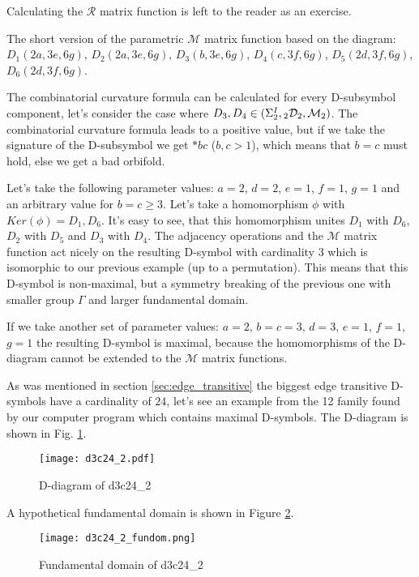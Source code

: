\documentclass[12pt,a4paper]{article}
\numberwithin{equation}{section}
\newcommand{\leftsub}[2]{{\vphantom{#2}}_{#1}{#2}}
\theoremstyle{plain}%
\theoremstyle{definition}
\theoremstyle{remark}
\begin{document}
Calculating the $\mathcal{R}$ matrix function is left to the reader as an
exercise.

The short version of the parametric $\mathcal{M}$ matrix function based on the
diagram: $D_1(2a, 3e, 6g)$, $D_2(2a, 3e, 6g)$, $D_3(b, 3e, 6g)$, $D_4(c, 3f,
6g)$, $D_5(2d, 3f, 6g)$, $D_6(2d, 3f, 6g)$.

The combinatorial curvature formula can be calculated for every D-subsymbol
component,
let's consider the case where
$D_3,D_4\in(\Sigma^I_2,\leftsub{2}{\mathcal{D}}_2,\mathcal{M}_2)$. The combinatorial
curvature formula leads to a positive value, but if we take the signature of
the D-subsymbol we get $*bc$ ($b,c>1$), which means that $b=c$ must hold, else
we get a bad orbifold.

Let's take the following parameter values: $a=2$, $d=2$, $e=1$, $f=1$, $g=1$ and
an arbitrary value for $b=c\geq3$. Let's take a homomorphism $\phi$ with
$Ker(\phi)={D_1,D_6}$. It's easy to see, that this homomorphism unites $D_1$
with $D_6$, $D_2$ with $D_5$ and $D_3$ with $D_4$. The adjacency operations and
the $\mathcal{M}$ matrix function act nicely on the resulting D-symbol
with cardinality $3$ which is isomorphic to our previous example (up to a
permutation). This means that this D-symbol is non-maximal, but a symmetry
breaking of the previous one with smaller group $\Gamma$ and larger fundamental
domain.

If we take another set of parameter values: $a=2$, $b=c=3$, $d=3$, $e=1$,
$f=1$, $g=1$ the resulting D-symbol is maximal, because the homomorphisms of the
D-diagram cannot be extended to the $\mathcal{M}$ matrix functions.

As was mentioned in section \ref{sec:edge_transitive} the biggest edge
transitive D-symbols have a cardinality of $24$, let's see an example from the
12 family found by our computer program which contains maximal D-symbols.
The D-diagram is shown in Fig.
\ref{fig:d3c24_2}.

\begin{figure}
  \caption{\label{fig:d3c24_2} D-diagram of d3c24\_2}
  \center
  \texttt{[image: d3c24\_2.pdf]}
\end{figure}

A hypothetical fundamental domain is shown in Figure \ref{fig:d3c24_2_fundom}.

\begin{figure}
  \caption{\label{fig:d3c24_2_fundom} Fundamental domain of d3c24\_2}
  \center
  \texttt{[image: d3c24\_2\_fundom.png]}
\end{figure}
\end{document}
